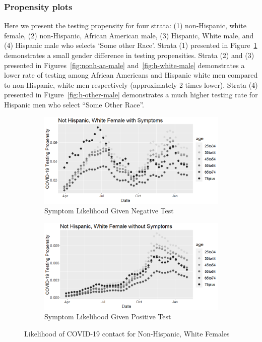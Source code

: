 \documentclass[12pt]{amsart}
\numberwithin{equation}{section}
\theoremstyle{plain}
\begin{document}
\subsubsection{Propensity plots}
\label{section:propplots}

Here we present the testing propensity for four strata: (1) non-Hispanic, white female, (2) non-Hispanic, African American male, (3) Hispanic, White male, and (4) Hispanic male who selects `Some other Race'.   Strata (1) presented in Figure~\ref{fig:nonh-white-female} demonstrates a small gender difference in testing propensities.  Strata (2) and (3) presented in Figures~\ref{fig:nonh-aa-male} and~\ref{fig:h-white-male} demonstrates a lower rate of testing among African Americans and Hispanic white men compared to non-Hispanic, white men respectively (approximately 2 times lower). Strata (4) presented in Figure~\ref{fig:h-other-male} demonstrates a much higher testing rate for Hispanic men who select ``Some Other Race''.

\begin{figure}[!th]
\centering
\begin{subfigure}{.5\textwidth}
 \centering
 \includegraphics[width=.9\linewidth]{../figs/tvprop_alt_fig1_supp4.png}
 \caption{Symptom Likelihood Given Negative Test}
\end{subfigure}%
\begin{subfigure}{.5\textwidth}
 \centering
\includegraphics[width=.9\linewidth]{../figs/tvprop_alt_fig2_supp4.png}
 \caption{Symptom Likelihood Given Positive Test}
\end{subfigure}
\caption{Likelihood of COVID-19 contact for Non-Hispanic, White Females}
\label{fig:nonh-white-female}
\end{figure}
\end{document}
